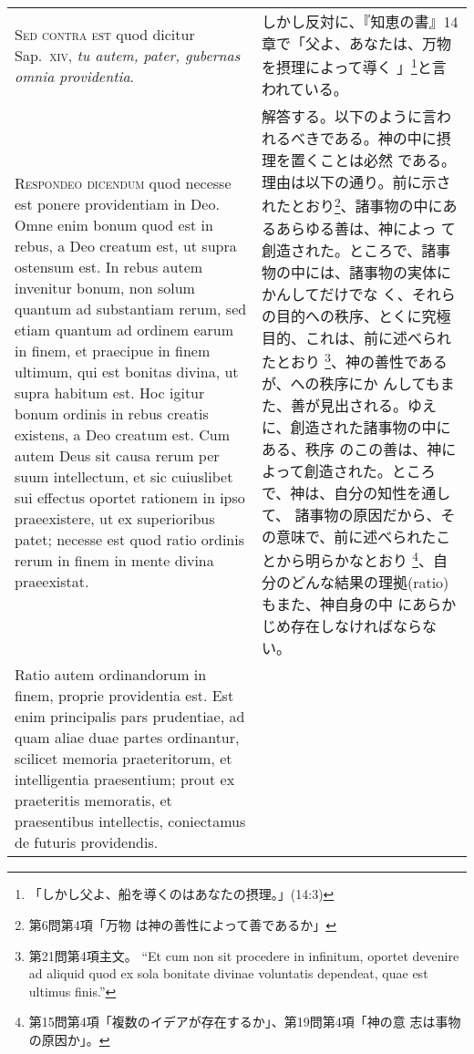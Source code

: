 \documentclass[10pt]{jsarticle} %
\begin{document}
\begin{longtable}{p{21em}p{21em}}
\\


{\scshape Sed contra est} quod dicitur Sap.~{\scshape xiv}, {\itshape tu
autem, pater, gubernas omnia providentia}.


&

しかし反対に、『知恵の書』14章で「父よ、あなたは、万物を摂理によって導く
 」\footnote{「しかし父よ、船を導くのはあなたの摂理。」(14:3)}と言われている。


\\


{\scshape Respondeo dicendum} quod necesse est ponere
providentiam in Deo. Omne enim bonum quod est in rebus, a Deo creatum
est, ut supra ostensum est. In rebus autem invenitur bonum, non solum
quantum ad substantiam rerum, sed etiam quantum ad ordinem earum in
finem, et praecipue in finem ultimum, qui est bonitas divina, ut supra
habitum est. Hoc igitur bonum ordinis in rebus creatis existens, a Deo
creatum est. Cum autem Deus sit causa rerum per suum intellectum, et sic
cuiuslibet sui effectus oportet rationem in ipso praeexistere, ut ex
superioribus patet; necesse est quod ratio ordinis rerum in finem in
mente divina praeexistat. 

&

解答する。以下のように言われるべきである。神の中に摂理を置くことは必然
である。理由は以下の通り。前に示されたとおり\footnote{第6問第4項「万物
は神の善性によって善であるか」}、諸事物の中にあるあらゆる善は、神によっ
て創造された。ところで、諸事物の中には、諸事物の実体にかんしてだけでな
く、それらの目的への秩序、とくに究極目的、これは、前に述べられたとおり
\footnote{第21問第4項主文。 ``Et cum non sit procedere in infinitum,
oportet devenire ad aliquid quod ex sola bonitate divinae voluntatis
dependeat, quae est ultimus finis.''}、神の善性であるが、への秩序にか
んしてもまた、善が見出される。ゆえに、創造された諸事物の中にある、秩序
のこの善は、神によって創造された。ところで、神は、自分の知性を通して、
諸事物の原因だから、その意味で、前に述べられたことから明らかなとおり
\footnote{第15問第4項「複数のイデアが存在するか」、第19問第4項「神の意
志は事物の原因か」。}、自分のどんな結果の理拠(ratio)もまた、神自身の中
にあらかじめ存在しなければならない。



\\


Ratio autem ordinandorum in finem, proprie
providentia est. Est enim principalis pars prudentiae, ad quam aliae
duae partes ordinantur, scilicet memoria praeteritorum, et intelligentia
praesentium; prout ex praeteritis memoratis, et praesentibus
intellectis, coniectamus de futuris providendis. 


\end{longtable}
\end{document}
